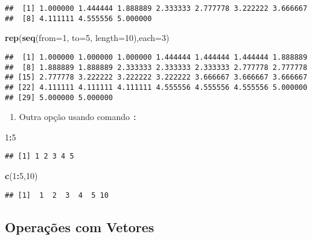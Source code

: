 \documentclass[]{article}
\newenvironment{Shaded}{\begin{snugshade}}{\end{snugshade}}
\newcommand{\KeywordTok}[1]{\textcolor[rgb]{0.13,0.29,0.53}{\textbf{#1}}}
\newcommand{\DataTypeTok}[1]{\textcolor[rgb]{0.13,0.29,0.53}{#1}}
\newcommand{\DecValTok}[1]{\textcolor[rgb]{0.00,0.00,0.81}{#1}}
\newcommand{\OperatorTok}[1]{\textcolor[rgb]{0.81,0.36,0.00}{\textbf{#1}}}
\newcommand{\NormalTok}[1]{#1}
\providecommand{\tightlist}{%
  \setlength{\itemsep}{0pt}\setlength{\parskip}{0pt}}
\begin{document}
\begin{verbatim}
##  [1] 1.000000 1.444444 1.888889 2.333333 2.777778 3.222222 3.666667
##  [8] 4.111111 4.555556 5.000000
\end{verbatim}

\begin{Shaded}
\begin{Highlighting}[]
\KeywordTok{rep}\NormalTok{(}\KeywordTok{seq}\NormalTok{(}\DataTypeTok{from=}\DecValTok{1}\NormalTok{, }\DataTypeTok{to=}\DecValTok{5}\NormalTok{, }\DataTypeTok{length=}\DecValTok{10}\NormalTok{),}\DataTypeTok{each=}\DecValTok{3}\NormalTok{)}
\end{Highlighting}
\end{Shaded}

\begin{verbatim}
##  [1] 1.000000 1.000000 1.000000 1.444444 1.444444 1.444444 1.888889
##  [8] 1.888889 1.888889 2.333333 2.333333 2.333333 2.777778 2.777778
## [15] 2.777778 3.222222 3.222222 3.222222 3.666667 3.666667 3.666667
## [22] 4.111111 4.111111 4.111111 4.555556 4.555556 4.555556 5.000000
## [29] 5.000000 5.000000
\end{verbatim}

\begin{enumerate}
\def\labelenumi{\arabic{enumi}.}
\setcounter{enumi}{4}
\tightlist
\item
  Outra opção usando comando \texttt{:}
\end{enumerate}

\begin{Shaded}
\begin{Highlighting}[]
\DecValTok{1}\OperatorTok{:}\DecValTok{5}
\end{Highlighting}
\end{Shaded}

\begin{verbatim}
## [1] 1 2 3 4 5
\end{verbatim}

\begin{Shaded}
\begin{Highlighting}[]
\KeywordTok{c}\NormalTok{(}\DecValTok{1}\OperatorTok{:}\DecValTok{5}\NormalTok{,}\DecValTok{10}\NormalTok{)}
\end{Highlighting}
\end{Shaded}

\begin{verbatim}
## [1]  1  2  3  4  5 10
\end{verbatim}

\subsection{Operações com Vetores}\label{operacoes-com-vetores}
\end{document}
